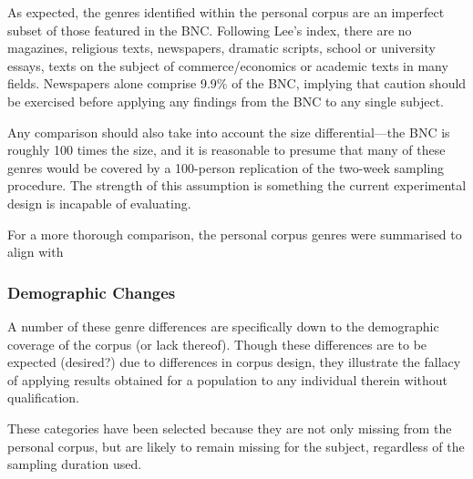 As expected, the genres identified within the personal corpus are an imperfect subset of those featured in the BNC.  Following Lee's index, there are no magazines, religious texts, newspapers, dramatic scripts, school or university essays, texts on the subject of commerce/economics or academic texts in many fields.  Newspapers alone comprise 9.9\% of the BNC, implying that caution should be exercised before applying any findings from the BNC to any single subject. %

Any comparison should also take into account the size differential---the BNC is roughly 100 times the size, and it is reasonable to presume that many of these genres would be covered by a 100-person replication of the two-week sampling procedure.  The strength of this assumption is something the current experimental design is incapable of evaluating.




For a more thorough comparison, the personal corpus genres were summarised to align with 










\subsubsection{Demographic Changes}
A number of these genre differences are specifically down to the demographic coverage of the corpus (or lack thereof).  Though these differences are to be expected (desired?) due to differences in corpus design, they illustrate the fallacy of applying results obtained for a population to any individual therein without qualification.

These categories have been selected because they are not only missing from the personal corpus, but are likely to remain missing for the subject, regardless of the sampling duration used.


